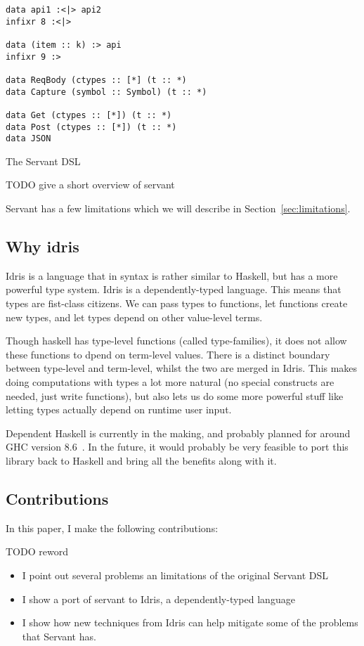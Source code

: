 \documentclass[12pt,a4paper]{article}
\begin{document}
\begin{listing}[H]
\begin{verbatim}
data api1 :<|> api2
infixr 8 :<|>

data (item :: k) :> api
infixr 9 :>

data ReqBody (ctypes :: [*] (t :: *)
data Capture (symbol :: Symbol) (t :: *)

data Get (ctypes :: [*]) (t :: *)
data Post (ctypes :: [*]) (t :: *)
data JSON
\end{verbatim}
\caption{The Servant DSL}
\label{lab:servant}
\end{listing}

TODO give a short overview of servant

Servant has a few limitations which we will describe in Section~\ref{sec:limitations}. 


\subsection{Why idris}
Idris is a language that in syntax is rather similar to Haskell, but has a more powerful type system. Idris is a dependently-typed language. This means that types are fist-class citizens. We can pass types to functions, let functions create new types, and let types depend on other value-level terms.

Though haskell has type-level functions (called type-families), it does not allow these functions to dpend on term-level values. There is a distinct boundary between type-level and term-level, whilst the two are merged in Idris. This makes doing computations with types a lot more natural (no special constructs are needed, just write functions), but also lets us do some more powerful stuff like letting types actually depend on runtime user input.

Dependent Haskell is currently in the making, and probably planned for around GHC version 8.6~\cite{neeeded}. In the future, it would probably be very feasible to port this library back to Haskell and bring all the benefits along with it.

\subsection{Contributions}
In this paper, I make the following contributions:

TODO reword
\begin{itemize}
  \item I point out several problems an limitations of the original Servant DSL
  \item I show a port of servant to Idris, a dependently-typed language
  \item I show how new techniques from Idris can help mitigate some of the problems that Servant has.
\end{itemize}
\end{document}
